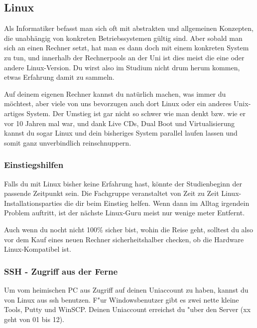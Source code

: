 \subsection{Linux}
\label{linux}
Als Informatiker befasst man sich oft mit abstrakten und allgemeinen 
Konzepten, die unabhängig von konkreten Betriebssystemen gültig sind. 
Aber sobald man sich an einen Rechner setzt, hat man es dann doch mit 
einem konkreten System zu tun, und innerhalb der Rechnerpools an der Uni
ist dies meist die eine oder andere Linux-Version. Du wirst also im 
Studium nicht drum herum kommen, etwas Erfahrung damit zu sammeln.

Auf deinem eigenen Rechner kannst du natürlich machen,
was immer du möchtest, aber viele von uns bevorzugen auch dort Linux
oder ein anderes Unix-artiges System. Der Umstieg ist gar nicht so
schwer wie man denkt bzw. wie er vor 10 Jahren mal war, und dank Live CDs,
Dual Boot und Virtualisierung kannst du sogar Linux und dein bisheriges 
System parallel laufen lassen und somit ganz unverbindlich reinschnuppern.

\subsubsection{Einstiegshilfen}
Falls du mit Linux bisher keine Erfahrung hast, könnte der Studienbeginn
 der passende Zeitpunkt sein. Die Fachgruppe veranstaltet von Zeit zu Zeit 
Linux-Installationsparties die dir beim Einstieg helfen. Wenn dann im Alltag
irgendein Problem auftritt, ist der nächste Linux-Guru meist nur wenige
meter Entfernt.

Auch wenn du nocht nicht 100\% sicher bist, wohin die Reise geht, solltest 
du also vor dem Kauf eines neuen Rechner sicherheitshalber checken, ob die 
Hardware Linux-Kompatibel ist.


\subsubsection{SSH - Zugriff aus der Ferne}
Um vom heimischen PC aus Zugriff auf deinen Uniaccount zu haben, kannst
du von Linux aus ssh benutzen. F"ur Windowsbenutzer gibt es zwei nette
kleine Tools, Putty und WinSCP. Deinen Uniaccount erreichst du "uber
den Server  (xx geht von 01 bis 12).

